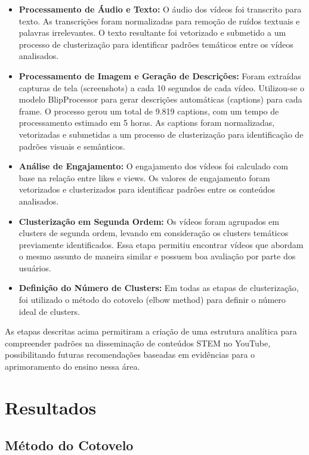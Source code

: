 \documentclass[manuscript,screen,review]{acmart}
\begin{document}
\begin{itemize}
    \item \textbf{Processamento de Áudio e Texto:} 
    O áudio dos vídeos foi transcrito para texto. As transcrições foram normalizadas para remoção de ruídos textuais e palavras irrelevantes. O texto resultante foi vetorizado e submetido a um processo de clusterização para identificar padrões temáticos entre os vídeos analisados.

    \item \textbf{Processamento de Imagem e Geração de Descrições:} 
    Foram extraídas capturas de tela (screenshots) a cada 10 segundos de cada vídeo. Utilizou-se o modelo BlipProcessor para gerar descrições automáticas (captions) para cada frame. O processo gerou um total de 9.819 captions, com um tempo de processamento estimado em 5 horas. As captions foram normalizadas, vetorizadas e submetidas a um processo de clusterização para identificação de padrões visuais e semânticos.

    \item \textbf{Análise de Engajamento:} 
    O engajamento dos vídeos foi calculado com base na relação entre likes e views. Os valores de engajamento foram vetorizados e clusterizados para identificar padrões entre os conteúdos analisados.

    \item \textbf{Clusterização em Segunda Ordem:} 
    Os vídeos foram agrupados em clusters de segunda ordem, levando em consideração os clusters temáticos previamente identificados. Essa etapa permitiu encontrar vídeos que abordam o mesmo assunto de maneira similar e possuem boa avaliação por parte dos usuários.

    \item \textbf{Definição do Número de Clusters:} 
    Em todas as etapas de clusterização, foi utilizado o método do cotovelo (elbow method) para definir o número ideal de clusters.
\end{itemize}

As etapas descritas acima permitiram a criação de uma estrutura analítica para compreender padrões na disseminação de conteúdos STEM no YouTube, possibilitando futuras recomendações baseadas em evidências para o aprimoramento do ensino nessa área.

\section{Resultados}

\subsection{Método do Cotovelo}
\end{document}
